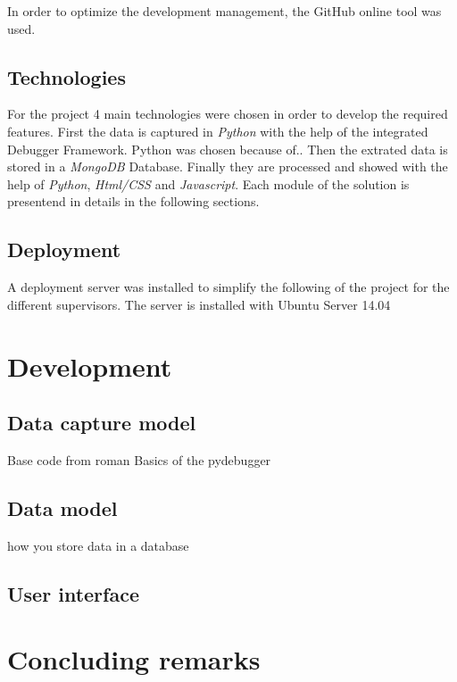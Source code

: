 In order to optimize the development management, the GitHub online tool was used.

\subsection{Technologies}
For the project 4 main technologies were chosen in order to develop the required features. First the data is captured in \textit{Python} with the help of the integrated Debugger Framework. Python was chosen because of..
Then the extrated data is stored in a \textit{MongoDB} Database. Finally they are processed and showed with the help of \textit{Python}, \textit{Html/CSS} and \textit{Javascript}. Each module of the solution is presentend in details in the following sections. 

\subsection{Deployment}
A deployment server was installed to simplify the following of the project for the different supervisors. The server is installed with Ubuntu Server 14.04

\section{Development}

\subsection{Data capture model}
Base code from roman
Basics of the pydebugger

\subsection{Data model}
how you store data in a database

\subsection{User interface}

\section{Concluding remarks}
